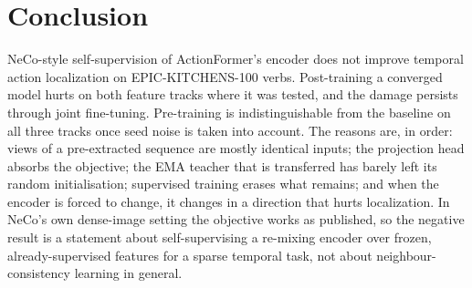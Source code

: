 \documentclass[10pt,a4paper]{article}
\begin{document}
\section{Conclusion}

NeCo-style self-supervision of ActionFormer's encoder does not improve temporal action
localization on EPIC-KITCHENS-100 verbs. Post-training a converged model hurts
on both feature tracks where it was tested, and the damage persists through joint
fine-tuning. Pre-training is indistinguishable from the baseline on all three tracks
once seed noise is taken into account. The reasons are, in order: views of a
pre-extracted sequence are mostly identical inputs; the projection head absorbs the
objective; the EMA teacher that is transferred has barely left its random
initialisation; supervised training erases what remains; and when the encoder is forced
to change, it changes in a direction that hurts localization. In NeCo's own dense-image
setting the objective works as published, so the negative result is a statement about
self-supervising a re-mixing encoder over frozen, already-supervised features for a
sparse temporal task, not about neighbour-consistency learning in general.

\small


\end{document}
